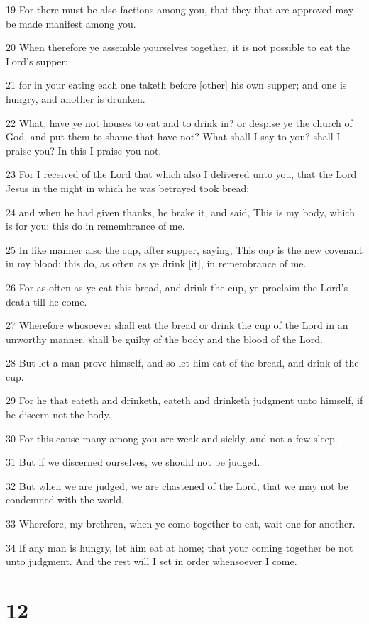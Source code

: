 \par 19 For there must be also factions among you, that they that are approved may be made manifest among you.
\par 20 When therefore ye assemble yourselves together, it is not possible to eat the Lord's supper:
\par 21 for in your eating each one taketh before [other] his own supper; and one is hungry, and another is drunken.
\par 22 What, have ye not houses to eat and to drink in? or despise ye the church of God, and put them to shame that have not? What shall I say to you? shall I praise you? In this I praise you not.
\par 23 For I received of the Lord that which also I delivered unto you, that the Lord Jesus in the night in which he was betrayed took bread;
\par 24 and when he had given thanks, he brake it, and said, This is my body, which is for you: this do in remembrance of me.
\par 25 In like manner also the cup, after supper, saying, This cup is the new covenant in my blood: this do, as often as ye drink [it], in remembrance of me.
\par 26 For as often as ye eat this bread, and drink the cup, ye proclaim the Lord's death till he come.
\par 27 Wherefore whosoever shall eat the bread or drink the cup of the Lord in an unworthy manner, shall be guilty of the body and the blood of the Lord.
\par 28 But let a man prove himself, and so let him eat of the bread, and drink of the cup.
\par 29 For he that eateth and drinketh, eateth and drinketh judgment unto himself, if he discern not the body.
\par 30 For this cause many among you are weak and sickly, and not a few sleep.
\par 31 But if we discerned ourselves, we should not be judged.
\par 32 But when we are judged, we are chastened of the Lord, that we may not be condemned with the world.
\par 33 Wherefore, my brethren, when ye come together to eat, wait one for another.
\par 34 If any man is hungry, let him eat at home; that your coming together be not unto judgment. And the rest will I set in order whensoever I come.

\chapter{12}

